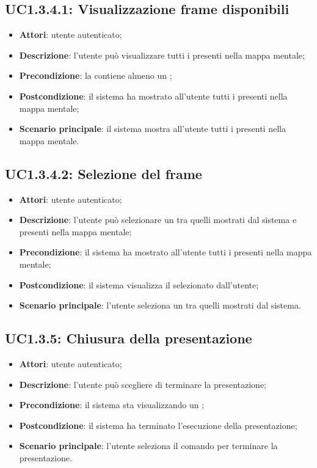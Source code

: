 \subsection{UC1.3.4.1: Visualizzazione frame disponibili}
\label{UC1.3.4.1}
\begin{itemize}
\item \textbf{Attori}: utente autenticato;
\item \textbf{Descrizione}: l'utente può visualizzare tutti i  presenti nella mappa mentale;
\item \textbf{Precondizione}: la  contiene almeno un ;
\item \textbf{Postcondizione}: il sistema ha mostrato all'utente tutti i  presenti nella mappa mentale;
\item \textbf{Scenario principale}:
il sistema mostra all'utente tutti i  presenti nella mappa mentale.
\end{itemize}
\subsection{UC1.3.4.2: Selezione del frame}
\label{UC1.3.4.2}
\begin{itemize}
\item \textbf{Attori}: utente autenticato;
\item \textbf{Descrizione}: l'utente può selezionare un  tra quelli mostrati dal sistema e presenti nella mappa mentale;
\item \textbf{Precondizione}: il sistema ha mostrato all'utente tutti i  presenti nella mappa mentale;
\item \textbf{Postcondizione}: il sistema visualizza il  selezionato dall'utente;
\item \textbf{Scenario principale}:
l'utente seleziona un  tra quelli mostrati dal sistema.
\end{itemize}
\subsection{UC1.3.5: Chiusura della presentazione}
\label{UC1.3.5}
\begin{itemize}
\item \textbf{Attori}: utente autenticato;
\item \textbf{Descrizione}: l'utente può scegliere di terminare la presentazione;
\item \textbf{Precondizione}: il sistema sta visualizzando un ;
\item \textbf{Postcondizione}: il sistema ha terminato l'esecuzione della presentazione;
\item \textbf{Scenario principale}:
l'utente seleziona il comando per terminare la presentazione.
\end{itemize}

